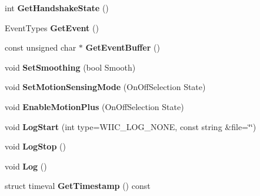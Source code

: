 \begin{DoxyCompactItemize}
\item 
\hypertarget{class_c_wiimote_a35a74550a3ec0115ccb39054da4b5064}{int {\bfseries Get\-Handshake\-State} ()}\label{class_c_wiimote_a35a74550a3ec0115ccb39054da4b5064}

\item 
\hypertarget{class_c_wiimote_a2f453ed8f5f825d0e503f6f0980d3c70}{Event\-Types {\bfseries Get\-Event} ()}\label{class_c_wiimote_a2f453ed8f5f825d0e503f6f0980d3c70}

\item 
\hypertarget{class_c_wiimote_a4ed15cfe1340119e090bd9c1feb86e17}{const unsigned char $\ast$ {\bfseries Get\-Event\-Buffer} ()}\label{class_c_wiimote_a4ed15cfe1340119e090bd9c1feb86e17}

\item 
\hypertarget{class_c_wiimote_a5f2218caddda3453cfdce8c27262a533}{void {\bfseries Set\-Smoothing} (bool Smooth)}\label{class_c_wiimote_a5f2218caddda3453cfdce8c27262a533}

\item 
\hypertarget{class_c_wiimote_a3c8c97c0b796d449e143a1a9147925bc}{void {\bfseries Set\-Motion\-Sensing\-Mode} (On\-Off\-Selection State)}\label{class_c_wiimote_a3c8c97c0b796d449e143a1a9147925bc}

\item 
\hypertarget{class_c_wiimote_ad3e4373c9ab443498f7f6b5cb9c73f20}{void {\bfseries Enable\-Motion\-Plus} (On\-Off\-Selection State)}\label{class_c_wiimote_ad3e4373c9ab443498f7f6b5cb9c73f20}

\item 
\hypertarget{class_c_wiimote_ab6d3946204a8836f800e4fd7a7643572}{void {\bfseries Log\-Start} (int type=W\-I\-I\-C\-\_\-\-L\-O\-G\-\_\-\-N\-O\-N\-E, const string \&file=\char`\"{}\char`\"{})}\label{class_c_wiimote_ab6d3946204a8836f800e4fd7a7643572}

\item 
\hypertarget{class_c_wiimote_ab4ca7dc470ba7da2ae2c321788ac12a6}{void {\bfseries Log\-Stop} ()}\label{class_c_wiimote_ab4ca7dc470ba7da2ae2c321788ac12a6}

\item 
\hypertarget{class_c_wiimote_ac07a724c6f0485927c666116d39e6dcc}{void {\bfseries Log} ()}\label{class_c_wiimote_ac07a724c6f0485927c666116d39e6dcc}

\item 
\hypertarget{class_c_wiimote_ac3f59a474bed928f29c7ea37a267a516}{struct timeval {\bfseries Get\-Timestamp} () const }\label{class_c_wiimote_ac3f59a474bed928f29c7ea37a267a516}


\end{DoxyCompactItemize}
